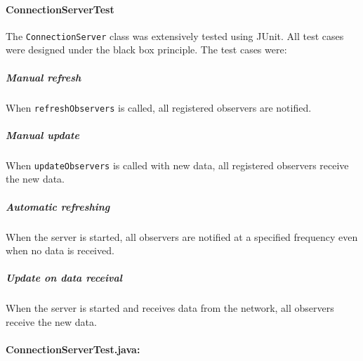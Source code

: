 \documentclass{article}
\begin{document}
\paragraph{ConnectionServerTest \\}

The \verb|ConnectionServer| class was extensively tested using JUnit. All test cases were designed under the black box principle. The test cases were:

\subparagraph{Manual refresh \\}
When \verb|refreshObservers| is called, all registered observers are notified.

\subparagraph{Manual update \\}
When \verb|updateObservers| is called with new data, all registered observers receive the new data.

\subparagraph{Automatic refreshing \\}
When the server is started, all observers are notified at a specified frequency even when no data is received.

\subparagraph{Update on data receival \\}
When the server is started and receives data from the network, all observers receive the new data.

\paragraph{ConnectionServerTest.java:}
\end{document}
